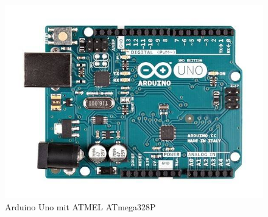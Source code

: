 \documentclass[11pt,a4paper]{scrartcl}
\begin{document}
\begin{figure}[h!]
\centering
\includegraphics[scale=0.4]{uno.png}
\caption{Arduino Uno mit ATMEL ATmega328P}
\end{figure}
\end{document}
